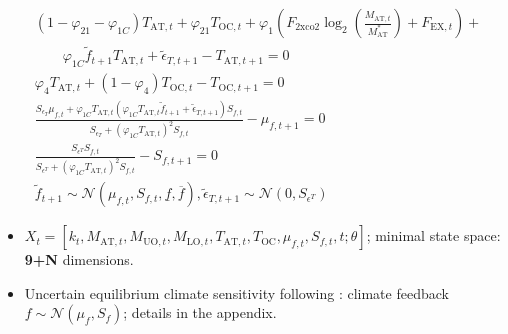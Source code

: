 \documentclass[aspectratio=169,11pt]{beamer}
\newcommand{\keyc}[1]{\textcolor{uzhblue}{#1}}
\begin{document}
\begin{frame}
\begin{center}
{\begin{minipage}{\linewidth}
\begin{align*}
& \nonumber
\left( 1 - \varphi_{21} - \varphi_{1C}\right)T_{\mathrm{AT},t}+\varphi_{21}T_{\mathrm{OC},t}
+ \varphi_1 \left(F_{\mathrm{2xco2}} \log_2 \left(\frac{M_{\mathrm{AT},t}}{M_{\mathrm{AT}}^\ast} \right)+F_{\mathrm{EX},t} \right) +  \\
&
\qquad \varphi_{1C}\tilde{f}_{t+1}T_{\mathrm{AT}, t} + \tilde{\epsilon}_{T, t+1} - T_{\mathrm{AT},t+1} = 0
 \\
&
\varphi_{4}T_{\mathrm{AT},t}+\left(1-\varphi_{4}\right)T_{\mathrm{OC},t}
  -  T_{\mathrm{OC},t+1} = 0 \\
 &
  \frac{
 S_{\epsilon_{T}} \mu_{f,t} +  \varphi_{1C} T_{\mathrm{AT}, t}  \left( \varphi_{1C} T_{\mathrm{AT}, t} \tilde{f}_{t+1} + \tilde{\epsilon}_{T,t+1}  \right) S_{f, t}}{S_{\epsilon_{T}} + \left(\varphi_{1C} T_{\mathrm{AT}, t} \right)^2 S_{f, t} } - \mu_{f,t+1} = 0\\
&
 \frac{S_{\epsilon^{T}} S_{f, t}}{S_{\epsilon^{T}} + \left( \varphi_{1C} T_{\mathrm{AT}, t} \right)^{2} S_{f, t}}  - S_{f, t+1} = 0 \\
&
\tilde{f}_{t+1} \sim \mathcal{N}\left( \mu_{f,t}, S_{f, t}, \underline{f}, \overline{f} \right),
\tilde{\epsilon}_{T,t+1} \sim \mathcal{N}\left( 0, S_{\epsilon^T} \right)
\end{align*}
\end{minipage}
}
\end{center}
\vspace{-0.3em}
\begin{scriptsize}
\begin{itemize}
    \item $X_{t} = \left[ k_{t}, M_{\mathrm{AT}, t}, M_{\mathrm{UO}, t}, M_{\mathrm{LO}, t}, T_{\mathrm{AT}, t}, T_{\mathrm{OC}}, \mu_{f,t}, S_{f,t}, t; \theta\right]$; \keyc{minimal state space: \textbf{9+N} dimensions}.
    \item Uncertain equilibrium climate sensitivity following \cite{roe2007climate}: climate feedback $f \sim \mathcal{N}(\mu_f, S_f)$; details in the appendix.
\end{itemize}
\end{scriptsize}
\end{frame}
\end{document}
